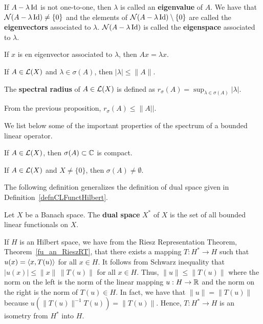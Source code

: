 \begin{defn}
If $A-\lambda \operatorname{Id}$ is not one-to-one, then $\lambda$ is called an
{\bfseries eigenvalue} of $A$.  We have that
$\mathcal{N}(A-\lambda\operatorname{Id}) \neq \{0\}$ and the elements of 
$\mathcal{N}(A-\lambda\operatorname{Id}) \setminus \{0\}$ are called the
{\bfseries eigenvectors} associated
to $\lambda$.  $\mathcal{N}(A-\lambda\operatorname{Id})$
is called the {\bfseries eigenspace}
associated to $\lambda$.
\end{defn}

If $x$ is en eigenvector associated to $\lambda$, then
$Ax = \lambda x$.

\begin{prop}
If $A \in \mathcal{L}(X)$ and $\lambda \in \sigma(A)$, then $|\lambda|\leq \|A\|$.
\end{prop}

\begin{defn}
The {\bfseries spectral radius}
of $A\in \mathcal{L}(X)$ is defined as
$\displaystyle r_\sigma(A) = \sup_{\lambda\in \sigma(A)} |\lambda|$.
\end{defn}

From the previous proposition, $r_\sigma(A) \leq \|A||$.

We list below some of the important properties of
the spectrum of a bounded linear operator.

\begin{prop}
If $A \in \mathcal{L}(X)$, then $\sigma(A) \subset \mathbb{C}$ is compact.
\end{prop}

\begin{prop}
If $A \in \mathcal{L}(X)$ and $X\neq \{0\}$, then $\sigma(A) \neq \emptyset$.
\end{prop}

The following definition generalizes the definition of dual space
given in Definition~\ref{defnCLFunctHilbert}.

\begin{defn}
Let $X$ be a Banach space.  The {\bfseries dual space}
$\displaystyle X^\ast$ of $X$ is the set of all bounded linear
functionals on $X$.
\end{defn}

\begin{egg}
If $H$ is an Hilbert space, we have from the Riesz Representation
Theorem, Theorem~\ref{fu_an_RieszRT}, that there exists a mapping
$\displaystyle T:H^\ast \to H$ such that $u(x) = \left\langle{x} , {T(u)}\right\rangle$ for all
$x \in H$.  It follows from Schwarz inequality that
$|u(x)| \leq \|x\|\,\|T(u)\|$ for all $x \in H$.  Thus,
$\|u\| \leq \|T(u)\|$ where the norm on the left is the norm of
the linear mapping $u:H \to \mathbb{R}$ and the norm on the right is the norm
of $T(u) \in H$.  In fact, we have that $\|u\|=\|T(u)\|$ because
$\displaystyle u\left( \|T(u)\|^{-1} T(u)\right) = \|T(u)\|$.
Hence, $\displaystyle T:H^\ast \to H$ is an isometry from
$\displaystyle H^\ast$ into $H$.
\end{egg}

